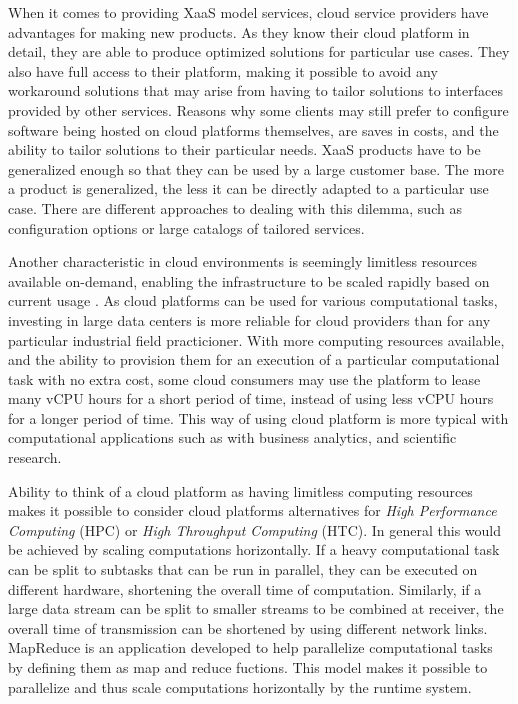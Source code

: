 When it comes to providing XaaS model services, cloud service providers have
advantages for making new products. As they know their cloud platform in
detail, they are able to produce optimized solutions for particular use cases.
They also have full access to their platform, making it possible to avoid any
workaround solutions that may arise from having to tailor solutions to
interfaces provided by other services. Reasons why some clients may still
prefer to configure software being hosted on cloud platforms themselves, are
saves in costs, and the ability to tailor solutions to their particular needs.
XaaS products have to be generalized enough so that they can be used by a large
customer base. The more a product is generalized, the less it can be directly
adapted to a particular use case. There are different approaches to dealing
with this dilemma, such as configuration options or large catalogs of tailored
services.

Another characteristic in cloud environments is seemingly limitless resources
available on-demand, enabling the infrastructure to be scaled rapidly based on
current usage \cite{armbrust2010view}. As cloud platforms can be used for
various computational tasks, investing in large data centers is more reliable
for cloud providers than for any particular industrial field practicioner. With
more computing resources available, and the ability to provision them for an
execution of a particular computational task with no extra cost, some cloud
consumers may use the platform to lease many vCPU hours for a short period of
time, instead of using less vCPU hours for a longer period of time. This way of
using cloud platform is more typical with computational applications such as
with business analytics, and scientific research.

Ability to think of a cloud platform as having limitless computing resources
makes it possible to consider cloud platforms alternatives for \textit{High
Performance Computing} (HPC) or \textit{High Throughput Computing} (HTC). In
general this would be achieved by scaling computations horizontally. If a heavy
computational task can be split to subtasks that can be run in parallel, they
can be executed on different hardware, shortening the overall time of
computation. Similarly, if a large data stream can be split to smaller streams
to be combined at receiver, the overall time of transmission can be shortened
by using different network links. MapReduce \cite{mapreduce} is an application
developed to help parallelize computational tasks by defining them as map and
reduce fuctions. This model makes it possible to parallelize and thus scale
computations horizontally by the runtime system.

